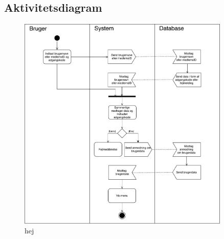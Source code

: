 \subsection{Aktivitetsdiagram}

\begin{figure} [H]
\centering
\includegraphics[width=0.9\textwidth]{figures/aktivitetsdiagram/Logind}
\caption{hej}
\label{fig:Logind}
\end{figure}
